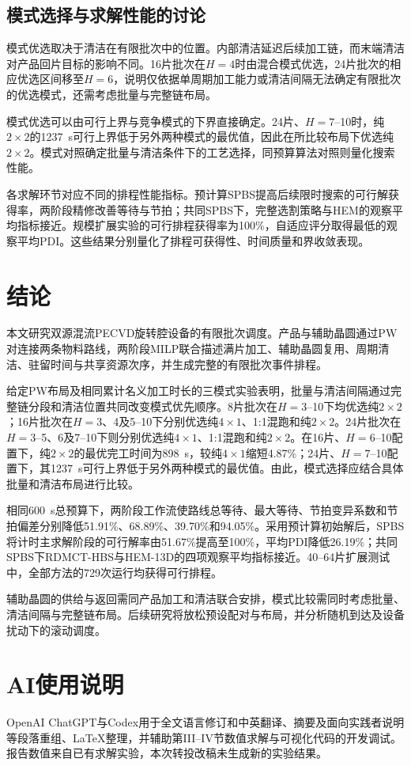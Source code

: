 \documentclass[journal]{IEEEtran}
\begin{document}
\subsection{模式选择与求解性能的讨论}

模式优选取决于清洁在有限批次中的位置。内部清洁延迟后续加工链，而末端清洁对产品回片目标的影响不同。16片批次在$H=4$时由混合模式优选，24片批次的相应优选区间移至$H=6$，说明仅依据单周期加工能力或清洁间隔无法确定有限批次的优选模式，还需考虑批量与完整链布局。

模式优选可以由可行上界与竞争模式的下界直接确定。24片、$H=7$--10时，纯$2\times2$的1237~s可行上界低于另外两种模式的最优值，因此在所比较布局下优选纯$2\times2$。模式对照确定批量与清洁条件下的工艺选择，同预算算法对照则量化搜索性能。

各求解环节对应不同的排程性能指标。预计算SPBS提高后续限时搜索的可行解获得率，两阶段精修改善等待与节拍；共同SPBS下，完整选割策略与HEM的观察平均指标接近。规模扩展实验的可行排程获得率为100\%，自适应评分取得最低的观察平均PDI。这些结果分别量化了排程可获得性、时间质量和界收敛表现。

\section{结论}

本文研究双源混流PECVD旋转腔设备的有限批次调度。产品与辅助晶圆通过PW对连接两条物料路线，两阶段MILP联合描述满片加工、辅助晶圆复用、周期清洁、驻留时间与共享资源次序，并生成完整的有限批次事件排程。

给定PW布局及相同累计名义加工时长的三模式实验表明，批量与清洁间隔通过完整链分段和清洁位置共同改变模式优先顺序。8片批次在$H=3$--10下均优选纯$2\times2$；16片批次在$H=3$、4及5--10下分别优选纯$4\times1$、1:1混跑和纯$2\times2$。24片批次在$H=3$--5、6及7--10下则分别优选纯$4\times1$、1:1混跑和纯$2\times2$。在16片、$H=6$--10配置下，纯$2\times2$的最优完工时间为898~s，较纯$4\times1$缩短4.87\%；24片、$H=7$--10配置下，其1237~s可行上界低于另外两种模式的最优值。由此，模式选择应结合具体批量和清洁布局进行比较。

相同600~s总预算下，两阶段工作流使路线总等待、最大等待、节拍变异系数和节拍偏差分别降低51.91\%、68.89\%、39.70\%和94.05\%。采用预计算初始解后，SPBS将计时主求解阶段的可行解率由51.67\%提高至100\%，平均PDI降低26.19\%；共同SPBS下RDMCT-HBS与HEM-13D的四项观察平均指标接近。40--64片扩展测试中，全部方法的729次运行均获得可行排程。

辅助晶圆的供给与返回需同产品加工和清洁联合安排，模式比较需同时考虑批量、清洁间隔与完整链布局。后续研究将放松预设配对与布局，并分析随机到达及设备扰动下的滚动调度。

\section*{AI使用说明}
OpenAI ChatGPT与Codex用于全文语言修订和中英翻译、摘要及面向实践者说明等段落重组、LaTeX整理，并辅助第III--IV节数值求解与可视化代码的开发调试。报告数值来自已有求解实验，本次转投改稿未生成新的实验结果。



\end{document}
